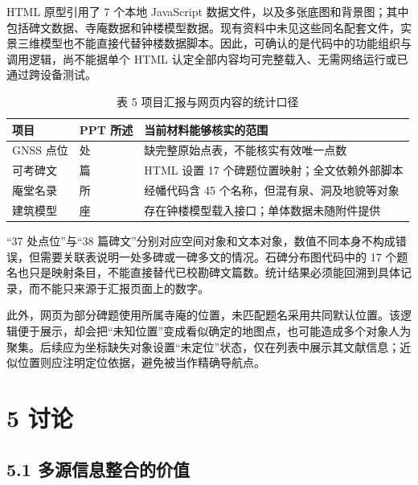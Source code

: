 \documentclass[UTF8,a4paper,zihao=-4]{ctexart}
\begin{document}
HTML 原型引用了 7 个本地 JavaScript 数据文件，以及多张底图和背景图；其中包括碑文数据、寺庵数据和钟楼模型数据。现有资料中未见这些同名配套文件，实景三维模型也不能直接代替钟楼数据脚本。因此，可确认的是代码中的功能组织与调用逻辑，尚不能据单个 HTML 认定全部内容均可完整载入、无需网络运行或已通过跨设备测试。


\begin{table}[H]\centering\caption*{表 5 项目汇报与网页内容的统计口径}\small

\begin{tabularx}{\textwidth}{>{\raggedright\arraybackslash}X>{\raggedright\arraybackslash}X>{\raggedright\arraybackslash}X}\toprule

项目 & PPT 所述 & 当前材料能够核实的范围 \\

\midrule

GNSS 点位 & 37 处 & 缺完整原始点表，不能核实有效唯一点数 \\

可考碑文 & 38 篇 & HTML 设置 17 个碑题位置映射；全文依赖外部脚本 \\

庵堂名录 & 45 所 & 经幡代码含 45 个名称，但混有泉、洞及地貌等对象 \\

建筑模型 & 1 座 & 存在钟楼模型载入接口；单体数据未随附件提供 \\

\bottomrule\end{tabularx}\end{table}

“37 处点位”与“38 篇碑文”分别对应空间对象和文本对象，数值不同本身不构成错误，但需要关联表说明一处多碑或一碑多文的情况。石碑分布图代码中的 17 个题名也只是映射条目，不能直接替代已校勘碑文篇数。统计结果必须能回溯到具体记录，而不能只来源于汇报页面上的数字。


此外，网页为部分碑题使用所属寺庵的位置，未匹配题名采用共同默认位置。该逻辑便于展示，却会把“未知位置”变成看似确定的地图点，也可能造成多个对象人为聚集。后续应为坐标缺失对象设置“未定位”状态，仅在列表中展示其文献信息；近似位置则应注明定位依据，避免被当作精确导航点。


\section*{5 讨论}

\subsection*{5.1 多源信息整合的价值}
\end{document}

